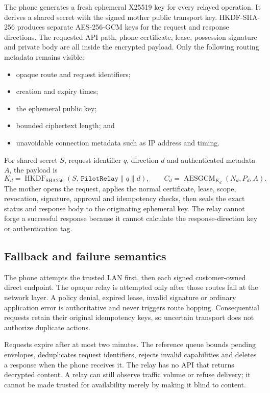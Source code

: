 The phone generates a fresh ephemeral X25519 key for every relayed operation.  It derives
a shared secret with the signed mother public transport key.  HKDF-SHA-256 produces
separate AES-256-GCM keys for the request and response directions.  The requested API
path, phone certificate, lease, possession signature and private body are all inside the
encrypted payload.  Only the following routing metadata remains visible:
\begin{itemize}
  \item opaque route and request identifiers;
  \item creation and expiry times;
  \item the ephemeral public key;
  \item bounded ciphertext length; and
  \item unavoidable connection metadata such as IP address and timing.
\end{itemize}

For shared secret $S$, request identifier $q$, direction $d$ and authenticated metadata
$A$, the payload is
\[
 K_d=\operatorname{HKDF}_{\mathrm{SHA256}}(S,\,\texttt{PilotRelay}\parallel q\parallel d),
 \qquad C_d=\operatorname{AESGCM}_{K_d}(N_d,P_d,A).
\]
The mother opens the request, applies the normal certificate, lease, scope, revocation,
signature, approval and idempotency checks, then seals the exact status and response body
to the originating ephemeral key.  The relay cannot forge a successful response because
it cannot calculate the response-direction key or authentication tag.

\subsection{Fallback and failure semantics}

The phone attempts the trusted LAN first, then each signed customer-owned direct endpoint.
The opaque relay is attempted only after those routes fail at the network layer.  A policy
denial, expired lease, invalid signature or ordinary application error is authoritative and
never triggers route hopping.  Consequential requests retain their original idempotency
keys, so uncertain transport does not authorize duplicate actions.

Requests expire after at most two minutes.  The reference queue bounds pending envelopes,
deduplicates request identifiers, rejects invalid capabilities and deletes a response when
the phone receives it.  The relay has no API that returns decrypted content.  A relay can
still observe traffic volume or refuse delivery; it cannot be made trusted for availability
merely by making it blind to content.

